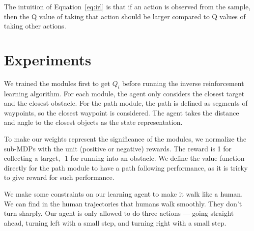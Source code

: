 \documentclass[11pt]{article} %
\begin{document}
The intuition of Equation~\ref{eq:irl} is that if an action is observed from the
sample, then the Q value of taking that action should be larger compared to Q
values of taking other actions.

\section{Experiments}
\label{sec:exp}

We trained the modules first to get $Q_i$ before running the inverse reinforcement
learning algorithm. For each module, the agent only considers the closest target
and the closest obstacle. For the path module, the path is defined as segments
of waypoints, so the closest waypoint is considered. The agent takes the
distance and angle to the closest objects as the state representation.

To make our weights represent the significance of the modules, we
normalize the sub-MDPs with the unit (positive or negative) rewards. The reward
is 1 for collecting a target, -1 for running into an obstacle. We define the
value function directly for the path module to have a path following
performance, as it is tricky to give reward for such performance.

We make some constraints on our learning agent to make it walk like a human.
We can find in the human trajectories that humans walk smoothly. They don't turn
sharply.  Our agent is only allowed to do three actions --- going straight ahead,
turning left with a small step, and turning right with a small step.
\end{document}
